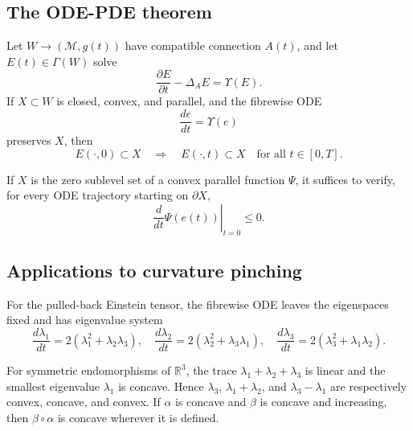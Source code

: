 \subsection{The ODE-PDE theorem}

\begin{theorem}
\label{topping-ch9-ode-pde-theorem}
Let \(W\to(\mathcal M,g(t))\) have compatible connection \(A(t)\), and let
\(E(t)\in\Gamma(W)\) solve
\[
\frac{\partial E}{\partial t}-\Delta_AE=\Upsilon(E).
\]
If \(X\subset W\) is closed, convex, and parallel, and the fibrewise ODE
\[
\frac{de}{dt}=\Upsilon(e)
\]
preserves \(X\), then
\[
E(\mathord\cdot,0)\subset X\quad\Longrightarrow\quad
E(\mathord\cdot,t)\subset X\quad\text{for all }t\in[0,T].
\]
\end{theorem}

\begin{remark}
\label{topping-ch9-ode-pde-boundary-test}
If \(X\) is the zero sublevel set of a convex parallel function \(\Psi\), it
suffices to verify, for every ODE trajectory starting on \(\partial X\),
\[
\left.\frac{d}{dt}\Psi(e(t))\right|_{t=0}\le0.
\]
\end{remark}

\subsection{Applications to curvature pinching}

\begin{remark}
\label{topping-ch9-ode-eigenvalue-system}
For the pulled-back Einstein tensor, the fibrewise ODE leaves the eigenspaces
fixed and has eigenvalue system
\[
\frac{d\lambda_1}{dt}=2(\lambda_1^2+\lambda_2\lambda_3),\quad
\frac{d\lambda_2}{dt}=2(\lambda_2^2+\lambda_3\lambda_1),\quad
\frac{d\lambda_3}{dt}=2(\lambda_3^2+\lambda_1\lambda_2).
\]
\end{remark}

\begin{lemma}
\label{topping-ch9-eigenvalue-convexity}
For symmetric endomorphisms of \(\mathbb R^3\), the trace
\(\lambda_1+\lambda_2+\lambda_3\) is linear and the smallest eigenvalue
\(\lambda_1\) is concave. Hence \(\lambda_3\),
\(\lambda_1+\lambda_2\), and \(\lambda_3-\lambda_1\) are respectively
convex, concave, and convex. If \(\alpha\) is concave and \(\beta\) is
concave and increasing, then \(\beta\circ\alpha\) is concave wherever it is
defined.
\end{lemma}

